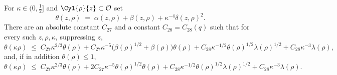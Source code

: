 \documentclass[11pt,reqno]{amsart}
\begin{document}
\begin{lemma}\label{lem:theta-decay}
For $\kappa\in(0,\tfrac12]$ and $\Cyl{\rho}{z}\subset\mathcal{O}$ set
\begin{equation}\label{eq:theta}
  \theta(z,\rho)\;=\;\alpha(z,\rho)+\beta(z,\rho)+\kappa^{-4}\delta(z,\rho)^{2}.
\end{equation}
There are an absolute constant $C_{27}$ and a constant $C_{28}=C_{28}(q)$ such
that for every such $z,\rho,\kappa$, suppressing $z$,
\begin{equation}\label{eq:theta-decay-1}
  \theta(\kappa\rho)\;\le\;C_{27}\kappa^{2/3}\theta(\rho)
   +C_{27}\kappa^{-5}\bigl(\beta(\rho)^{1/2}+\beta(\rho)\bigr)\theta(\rho)
   +C_{28}\kappa^{-1/2}\theta(\rho)^{1/2}\lambda(\rho)^{1/2}
   +C_{28}\kappa^{-3}\lambda(\rho),
\end{equation}
and, if in addition $\theta(\rho)\le1$,
\begin{equation}\label{eq:theta-decay-2}
  \theta(\kappa\rho)\;\le\;C_{27}\kappa^{2/3}\theta(\rho)
   +2C_{27}\kappa^{-5}\theta(\rho)^{1/2}\theta(\rho)
   +C_{28}\kappa^{-1/2}\theta(\rho)^{1/2}\lambda(\rho)^{1/2}
   +C_{28}\kappa^{-3}\lambda(\rho).
\end{equation}
\end{lemma}
\end{document}
